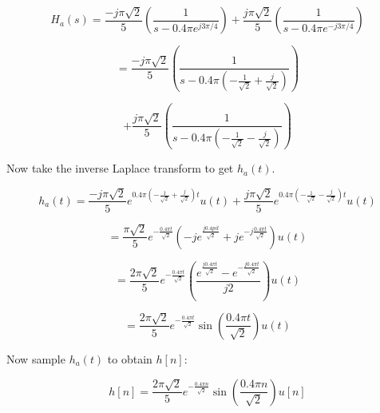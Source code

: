 \documentclass[fleqn]{article}
\begin{document}
\begin{enumerate}[nolistsep]
\begin{enumerate}[nolistsep]
				\begin{equation*}
					H_a(s) = \frac{-j\pi\sqrt{2}}{5}\left(\frac{1}{s - 0.4{\pi}e^{j3\pi/4}}\right) + \frac{j\pi\sqrt{2}}{5}\left(\frac{1}{s - 0.4{\pi}e^{-j3\pi/4}}\right)
				\end{equation*}
				
				\begin{equation*}
					= \frac{-j\pi\sqrt{2}}{5}\left(\frac{1}{s - 0.4{\pi}\left(-\frac{1}{\sqrt{2}} + \frac{j}{\sqrt{2}}\right)}\right)
				\end{equation*}
				
				\begin{equation*}
					 + \frac{j\pi\sqrt{2}}{5}\left(\frac{1}{s - 0.4{\pi}\left(-\frac{1}{\sqrt{2}} - \frac{j}{\sqrt{2}}\right)}\right)
				\end{equation*}
				
				Now take the inverse Laplace transform to get $h_a(t)$.
				
				\begin{equation*}
					h_a(t) = \frac{-j\pi\sqrt{2}}{5}e^{0.4\pi\left(-\frac{1}{\sqrt{2}} + \frac{j}{\sqrt{2}}\right)t}u(t) + \frac{j\pi\sqrt{2}}{5}e^{0.4\pi\left(-\frac{1}{\sqrt{2}} - \frac{j}{\sqrt{2}}\right)t}u(t)
				\end{equation*}
				
				\begin{equation*}
					= \frac{\pi\sqrt{2}}{5}e^{-\frac{0.4{\pi}t}{\sqrt{2}}}\left(-je^{\frac{j0.4{pi}t}{\sqrt{2}}} + je^{-j\frac{0.4{\pi}t}{\sqrt{2}}}\right)u(t)
				\end{equation*}
				
				\begin{equation*}
					= \frac{2\pi\sqrt{2}}{5}e^{-\frac{0.4{\pi}t}{\sqrt{2}}}\left(\frac{e^{\frac{j0.4{\pi}t}{\sqrt{2}}} - e^{-\frac{j0.4{\pi}t}{\sqrt{2}}}}{j2}\right)u(t)
				\end{equation*}
				
				\begin{equation*}
					 = \frac{2\pi\sqrt{2}}{5}e^{-\frac{0.4{\pi}t}{\sqrt{2}}}\sin{\left(\frac{0.4{\pi}t}{\sqrt{2}}\right)}u(t)
				\end{equation*}
				
				Now sample $h_a(t)$ to obtain $h[n]$:
				
				\begin{equation*}
					h[n] = \frac{2\pi\sqrt{2}}{5}e^{-\frac{0.4{\pi}n}{\sqrt{2}}}\sin{\left(\frac{0.4{\pi}n}{\sqrt{2}}\right)}u[n]
				\end{equation*}
				

\end{enumerate}
\end{enumerate}
\end{document}
